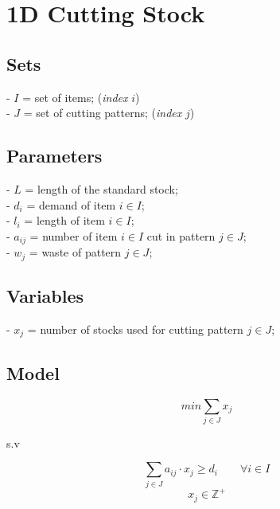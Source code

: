 \documentclass[a4paper,12pt,titlepage]{article}
\begin{document}
\section*{1D Cutting Stock}
\subsection*{Sets}
- $I$ = set of items; (\textit{index} $i$)\\
- $J$ = set of cutting patterns; (\textit{index} $j$)\\
\subsection*{Parameters}
- $L$ = length of the standard stock;\\
- $d_i$ = demand of item $i\in I$;\\
- $l_i$ = length of item $i\in I$;\\
- $a_{ij}$ = number of item $i\in I$ cut in pattern $j\in J$;\\
- $w_j$ = waste of pattern $j\in J$;\\
\subsection*{Variables}
- $x_j$ = number of stocks used for cutting pattern $j\in J$;\\
\subsection*{Model}
\begin{equation}
    min \sum_{j\in J} x_j
\end{equation}
\begin{center}
    s.v
\end{center}
\begin{equation}
    \sum_{j\in J} a_{ij}\cdot x_j \geq d_i \qquad \forall i\in I
\end{equation}
\begin{equation}
    x_j \in \mathbb{Z}^+
\end{equation}
\end{document}
